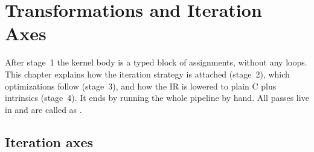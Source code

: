 \chapter{Transformations and Iteration Axes}\label{ch:transformations}

After stage~1 the kernel body is a typed block of assignments, without any loops. This
chapter explains how the iteration strategy is attached (stage~2), which optimizations
follow (stage~3), and how the IR is lowered to plain C plus intrinsics (stage~4). It
ends by running the whole pipeline by hand. All passes live in
 and are called as .

\section{Iteration axes}\label{sec:axes}

